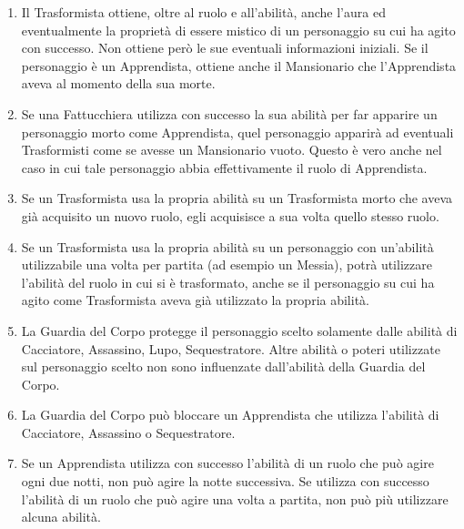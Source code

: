 \documentclass[a4paper,10pt]{article}
\begin{document}
\begin{enumerate}
	\item Il Trasformista ottiene, oltre al ruolo e all'abilità, anche l'aura ed eventualmente la proprietà di essere mistico di un personaggio su cui ha agito con successo. Non ottiene però le sue eventuali informazioni iniziali. Se il personaggio è un Apprendista, ottiene anche il Mansionario che l'Apprendista aveva al momento della sua morte.

	\item Se una Fattucchiera utilizza con successo la sua abilità per far apparire un personaggio morto come Apprendista, quel personaggio apparirà ad eventuali Trasformisti come se avesse un Mansionario vuoto. Questo è vero anche nel caso in cui tale personaggio abbia effettivamente il ruolo di Apprendista.

	\item Se un Trasformista usa la propria abilità su un Trasformista morto che aveva già acquisito un nuovo ruolo, egli acquisisce a sua volta quello stesso ruolo. %

	\item Se un Trasformista usa la propria abilità su un personaggio con un'abilità utilizzabile una volta per partita (ad esempio un Messia), potrà utilizzare l'abilità del ruolo in cui si è trasformato, anche se il personaggio su cui ha agito come Trasformista aveva già utilizzato la propria abilità.

	\item La Guardia del Corpo protegge il personaggio scelto solamente dalle abilità di Cacciatore, Assassino, Lupo, Sequestratore. Altre abilità o poteri utilizzate sul personaggio scelto non sono influenzate dall'abilità della Guardia del Corpo.

	\item La Guardia del Corpo può bloccare un Apprendista che utilizza l'abilità di Cacciatore, Assassino o Sequestratore.

	\item Se un Apprendista utilizza con successo l'abilità di un ruolo che può agire ogni due notti, non può agire la notte successiva. Se utilizza con successo l'abilità di un ruolo che può agire una volta a partita, non può più utilizzare alcuna abilità.


\end{enumerate}
\end{document}
